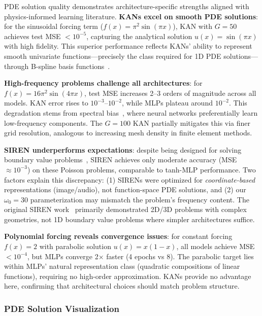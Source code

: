 \documentclass[11pt,a4paper]{article}
\begin{document}
PDE solution quality demonstrates architecture-specific strengths aligned with physics-informed learning literature. \textbf{KANs excel on smooth PDE solutions}: for the sinusoidal forcing term ($f(x) = \pi^2 \sin(\pi x)$), KAN with $G=50$ achieves test MSE $< 10^{-5}$, capturing the analytical solution $u(x) = \sin(\pi x)$ with high fidelity. This superior performance reflects KANs' ability to represent smooth univariate functions—precisely the class required for 1D PDE solutions—through B-spline basis functions~\citep{liu2024kan}.

\textbf{High-frequency problems challenge all architectures}: for $f(x) = 16\pi^2 \sin(4\pi x)$, test MSE increases 2--3 orders of magnitude across all models. KAN error rises to $10^{-3}$--$10^{-2}$, while MLPs plateau around $10^{-2}$. This degradation stems from spectral bias~\citep{krishnapriyan2021characterizing}, where neural networks preferentially learn low-frequency components. The $G=100$ KAN partially mitigates this via finer grid resolution, analogous to increasing mesh density in finite element methods.

\textbf{SIREN underperforms expectations}: despite being designed for solving boundary value problems~\citep{sitzmann2020implicit}, SIREN achieves only moderate accuracy (MSE $\approx 10^{-3}$) on these Poisson problems, comparable to tanh-MLP performance. Two factors explain this discrepancy: (1) SIRENs were optimized for \emph{coordinate-based} representations (image/audio), not function-space PDE solutions, and (2) our $\omega_0 = 30$ parameterization may mismatch the problem's frequency content. The original SIREN work~\citep{sitzmann2020implicit} primarily demonstrated 2D/3D problems with complex geometries, not 1D boundary value problems where simpler architectures suffice.

\textbf{Polynomial forcing reveals convergence issues}: for constant forcing $f(x) = 2$ with parabolic solution $u(x) = x(1-x)$, all models achieve MSE $< 10^{-4}$, but MLPs converge 2$\times$ faster (4 epochs vs 8). The parabolic target lies within MLPs' natural representation class (quadratic compositions of linear functions), requiring no high-order approximation. KANs provide no advantage here, confirming that architectural choices should match problem structure.

\subsubsection{PDE Solution Visualization}
\end{document}
